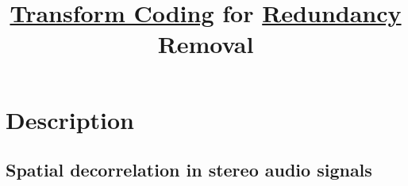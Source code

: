 
\title{\href{https://en.wikipedia.org/wiki/Transform_coding}{Transform Coding} for \href{https://en.wikipedia.org/wiki/Data_redundancy}{Redundancy} Removal}


\maketitle

\section{Description}

\subsection{Spatial decorrelation in stereo audio signals}

